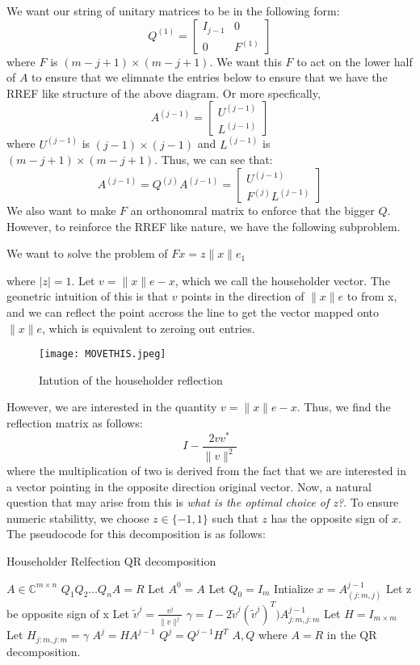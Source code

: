 \documentclass[11pt]{article}
\theoremstyle{definition}
\newcommand{\C}{\mathbb{C}}
\begin{document}
We want our string of unitary matrices to be in the following form:
\[
Q^{(1)} = \begin{bmatrix}
  I_{j-1} & 0 \\ 0 & F^{(1)}
\end{bmatrix}
\]
where $F$ is $(m - j + 1) \times (m - j + 1)$. We want this $F$ to act on the lower half of $A$ to ensure that we elimnate the entries below to ensure that we have the RREF like structure of the above diagram. Or more specfically, 
\[
A^{(j-1)} = \begin{bmatrix}
  U^{(j-1)} \\ L^{(j-1)}
\end{bmatrix}
\]
where $U^{(j-1)}$ is $(j-1) \times (j-1)$ and $L^{(j-1)}$ is $(m - j + 1) \times (m - j + 1)$. Thus, we can see that:
\[
A^{(j-1)} = Q^{(j)} A^{(j-1)} = \begin{bmatrix}
  U^{(j-1)} \\ F^{(j)} L^{(j-1)}
\end{bmatrix} 
\]
We also want to make $F$ an orthonomral matrix to enforce that the bigger $Q$. However, to reinforce the RREF like nature, we have the following subproblem. 
\begin{center}
  We want to solve the problem of $Fx = z \|x\| e_1$
\end{center}
where $|z| = 1$.  Let $v = \|x\|e - x$, which we call the householder vector. The geonetric intuition of this is that $v$ points in the direction of $\|x\|e$ to from x, and we can reflect the point accross the line to get the vector mapped onto $\|x\|e$, which is equivalent to zeroing out entries. 
\begin{figure}[H]
    \centering
    \texttt{[image: MOVETHIS.jpeg]}
    \caption{Intution of the householder reflection}
    \label{fig:enter-label}
\end{figure}
However, we are interested in the quantity $v = \|x\|e - x$. Thus, we find the reflection matrix as follows: 
\[
I - \frac{2v v^*}{\|v\|^2} 
\]
where the multiplication of two is derived from the fact that we are interested in a vector pointing in the opposite direction original vector. Now, a natural question that may arise from this is \emph{what is the optimal choice of z?}. To ensure numeric stabilitty, we choose $z \in \{-1, 1\}$ such that $z$ has the opposite sign of $x$. The pseudocode for this decomposition is as follows:
\begin{algorithm}[H]
  \caption{Householder Relfection QR decomposition}
  \begin{algorithmic}[1]
    \Require $A \in \C^{m \times n}$
    \Ensure $Q_1 Q_2 \dots Q_n A = R$
    \State Let $A^{0} = A$
    \State Let $Q_0 = I_m$
    \State Intialize 
      \State $x = A^{j-1}_{(j:m, j)}$
      \State Let z be opposite sign of x 
      \State Let $\tilde{v}^j = \frac{v^j}{\|v\|^j}$
      \State $\gamma = I - 2\tilde{v}^j (\tilde{v}^j)^T) A^{j-1}_{j:m, j:m}$
      \State Let $H = I_{m \times m}$
      \State Let $H_{j:m, j:m} = \gamma$
      \State $A^{j} = H A^{j-1}$
      \State $Q^{j} = Q^{j-1} H^T$
    \EndFor
    \State \Return $A, Q$ where $A = R$ in the QR decomposition. 
  \end{algorithmic}
\end{algorithm}
\end{document}
